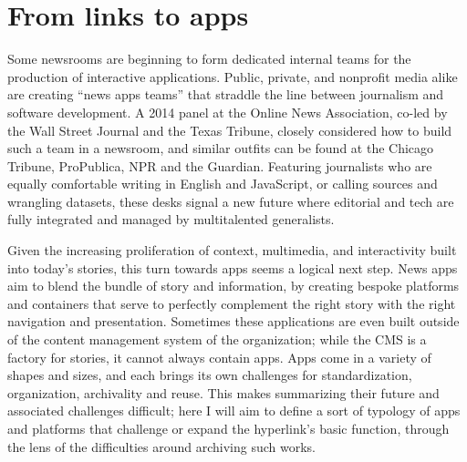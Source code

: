 
\section{From links to apps}

Some newsrooms are beginning to form dedicated internal teams for the production of interactive applications. Public, private, and nonprofit media alike are creating ``news apps teams'' that straddle the line between journalism and software development. A 2014 panel at the Online News Association, co-led by the Wall Street Journal and the Texas Tribune, closely considered how to build such a team in a newsroom, and similar outfits can be found at the Chicago Tribune, ProPublica, NPR and the Guardian.\autocite{mcbride_how_2014} Featuring journalists who are equally comfortable writing in English and JavaScript, or calling sources and wrangling datasets, these desks signal a new future where editorial and tech are fully integrated and managed by multitalented generalists.

Given the increasing proliferation of context, multimedia, and interactivity built into today's stories, this turn towards apps seems a logical next step. News apps aim to blend the bundle of story and information, by creating bespoke platforms and containers that serve to perfectly complement the right story with the right navigation and presentation. Sometimes these applications are even built outside of the content management system of the organization; while the CMS is a factory for stories, it cannot always contain apps. Apps come in a variety of shapes and sizes, and each brings its own challenges for standardization, organization, archivality and reuse. This makes summarizing their future and associated challenges difficult; here I will aim to define a sort of typology of apps and platforms that challenge or expand the hyperlink's basic function, through the lens of the difficulties around archiving such works.

